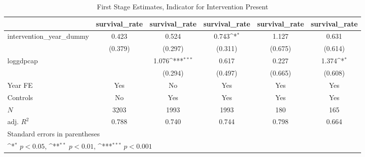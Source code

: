 \begin{table}[htbp]\centering
\def\sym#1{\ifmmode^{#1}\else\(^{#1}\)\fi}
\caption{First Stage Estimates, Indicator for Intervention Present}
\begin{tabular}{l*{5}{c}}
\hline\hline
          &\multicolumn{1}{c}{survival\_rate}&\multicolumn{1}{c}{survival\_rate}&\multicolumn{1}{c}{survival\_rate}&\multicolumn{1}{c}{survival\_rate}&\multicolumn{1}{c}{survival\_rate}\\
\hline
intervention\_year\_dummy&    0.423         &    0.524         &    0.743\sym{*}  &    1.127         &    0.631         \\
          &  (0.379)         &  (0.297)         &  (0.311)         &  (0.675)         &  (0.614)         \\
[1em]
loggdpcap &                  &    1.076\sym{***}&    0.617         &    0.227         &    1.374\sym{*}  \\
          &                  &  (0.294)         &  (0.497)         &  (0.665)         &  (0.608)         \\
[1em]
Year FE   &      Yes         &       No         &      Yes         &      Yes         &      Yes         \\
[1em]
Controls  &       No         &      Yes         &      Yes         &      Yes         &      Yes         \\
\hline
\(N\)     &     3203         &     1993         &     1993         &      180         &      165         \\
adj. \(R^{2}\)&    0.788         &    0.740         &    0.744         &    0.798         &    0.664         \\
\hline\hline
\multicolumn{6}{l}{\footnotesize Standard errors in parentheses}\\
\multicolumn{6}{l}{\footnotesize \sym{*} \(p<0.05\), \sym{**} \(p<0.01\), \sym{***} \(p<0.001\)}\\
\end{tabular}
\end{table}
